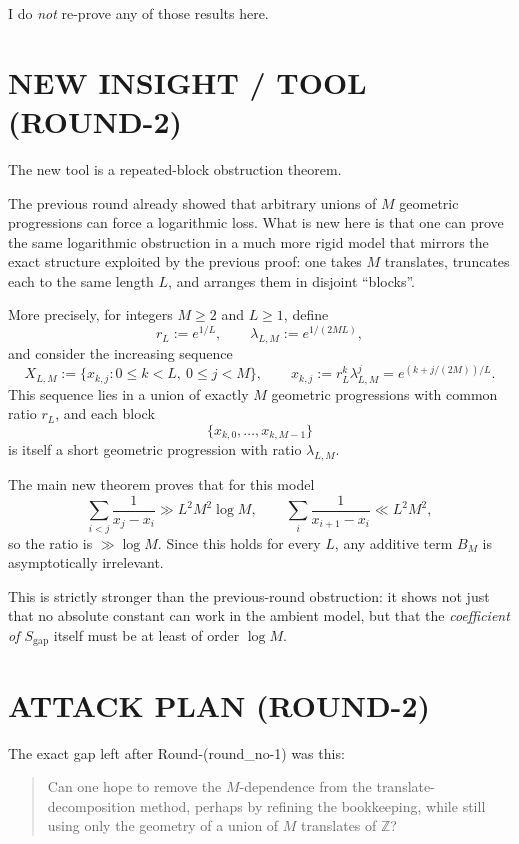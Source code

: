 I do \emph{not} re-prove any of those results here.

\section{NEW INSIGHT / TOOL (ROUND-2)}

The new tool is a repeated-block obstruction theorem.

The previous round already showed that arbitrary unions of \(M\) geometric progressions can force a logarithmic loss. What is new here is that one can prove the same logarithmic obstruction in a much more rigid model that mirrors the exact structure exploited by the previous proof: one takes \(M\) translates, truncates each to the same length \(L\), and arranges them in disjoint ``blocks''.

More precisely, for integers \(M\ge 2\) and \(L\ge 1\), define
\[
r_L:=e^{1/L},
\qquad
\lambda_{L,M}:=e^{1/(2ML)},
\]
and consider the increasing sequence
\[
X_{L,M}:=\{x_{k,j}: 0\le k<L,\ 0\le j<M\},
\qquad
x_{k,j}:=r_L^k\lambda_{L,M}^j=e^{(k+j/(2M))/L}.
\]
This sequence lies in a union of exactly \(M\) geometric progressions with common ratio \(r_L\), and each block
\[
\{x_{k,0},\dots,x_{k,M-1}\}
\]
is itself a short geometric progression with ratio \(\lambda_{L,M}\).

The main new theorem proves that for this model
\[
\sum_{i<j}\frac{1}{x_j-x_i}
\gg L^2M^2\log M,
\qquad
\sum_i\frac{1}{x_{i+1}-x_i}
\ll L^2M^2,
\]
so the ratio is \(\gg \log M\). Since this holds for every \(L\), any additive term \(B_M\) is asymptotically irrelevant.

This is strictly stronger than the previous-round obstruction: it shows not just that no absolute constant can work in the ambient model, but that the \emph{coefficient of \(S_{\mathrm{gap}}\)} itself must be at least of order \(\log M\).

\section{ATTACK PLAN (ROUND-2)}

The exact gap left after Round-(round\_no-1) was this:

\begin{quote}
Can one hope to remove the \(M\)-dependence from the translate-decomposition method, perhaps by refining the bookkeeping, while still using only the geometry of a union of \(M\) translates of \(\mathbb Z\)?
\end{quote}

